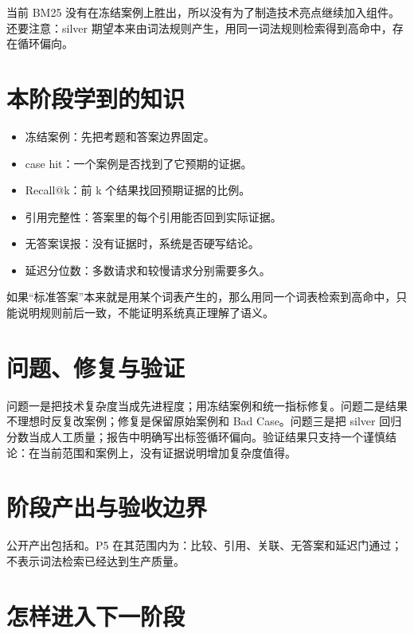 当前 BM25 没有在冻结案例上胜出，所以没有为了制造技术亮点继续加入组件。还要注意：silver 期望本来由词法规则产生，用同一词法规则检索得到高命中，存在循环偏向。

\section{本阶段学到的知识}

\begin{itemize}
  \item 冻结案例：先把考题和答案边界固定。
  \item case hit：一个案例是否找到了它预期的证据。
  \item Recall@k：前 k 个结果找回预期证据的比例。
  \item 引用完整性：答案里的每个引用能否回到实际证据。
  \item 无答案误报：没有证据时，系统是否硬写结论。
  \item 延迟分位数：多数请求和较慢请求分别需要多久。
\end{itemize}

\begin{beginnerbox}
如果“标准答案”本来就是用某个词表产生的，那么用同一个词表检索到高命中，只能说明规则前后一致，不能证明系统真正理解了语义。
\end{beginnerbox}

\section{问题、修复与验证}

问题一是把技术复杂度当成先进程度；用冻结案例和统一指标修复。问题二是结果不理想时反复改案例；修复是保留原始案例和 Bad Case。问题三是把 silver 回归分数当成人工质量；报告中明确写出标签循环偏向。验证结果只支持一个谨慎结论：在当前范围和案例上，没有证据说明增加复杂度值得。

\section{阶段产出与验收边界}

公开产出包括和。P5 在其范围内为\statuspassed：比较、引用、关联、无答案和延迟门通过；不表示词法检索已经达到生产质量。

\section{怎样进入下一阶段}

